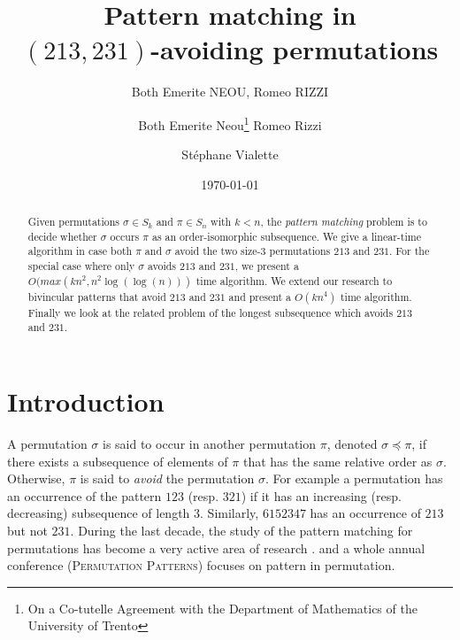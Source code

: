 \documentclass[a4paper]{llncs}
\begin{document}

\title{Pattern matching in\\ $(213,231)$-avoiding permutations}
\author{Both Emerite NEOU, Romeo RIZZI}
\date{}

\author{%
	Both Emerite Neou\thanks{On a Co-tutelle  Agreement with the Department of Mathematics of the University of Trento}
  Romeo Rizzi \and
  St\'ephane Vialette
}%

\date{\today}

\maketitle

\begin{abstract}
Given permutations $\sigma \in S_k$ and $\pi \in S_n$ with $k<n$, the
\emph{pattern matching} problem is to decide whether $\sigma$ occurs
$\pi$ as an order-isomorphic subsequence.
We give a linear-time algorithm in case both $\pi$ and $\sigma$ avoid
the two size-$3$ permutations $213$ and $231$.
For the special case where only $\sigma$ avoids $213$ and $231$, we present a
$O(max(kn^2,n^2\log(\log(n)))$ time algorithm. 
We extend our research to bivincular patterns that avoid $213$ and $231$ and present a $O(kn^4)$ time algorithm.
Finally we look at the related problem of the longest subsequence which avoids $213$ and $231$.  
\end{abstract}



\section{Introduction}
\label{section:Introduction}



A permutation $\sigma$ is said to occur in another permutation $\pi$,
denoted $\sigma \preceq \pi$,
if there exists a subsequence of elements of $\pi$ that has the same relative
order as $\sigma$.
Otherwise, $\pi$ is said to \emph{avoid} the permutation $\sigma$.
For example a permutation has an occurrence of the pattern $123$ (resp. $321$) if it has
an increasing (resp. decreasing) subsequence of length $3$.
Similarly,
$6152347$ has an occurrence of $213$ but not $231$.
During the last decade, the study of the pattern matching for permutations has
become a very active area of research \cite{Kitaev:book:2011}. and
a whole annual conference (\textsc{Permutation Patterns}) focuses
on pattern in permutation.
\end{document}
